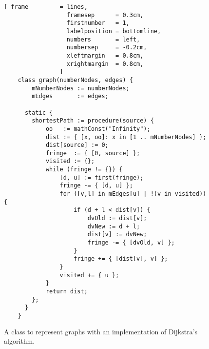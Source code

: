 \begin{figure}[!ht]
\centering
\begin{Verbatim}[ frame         = lines, 
                  framesep      = 0.3cm, 
                  firstnumber   = 1,
                  labelposition = bottomline,
                  numbers       = left,
                  numbersep     = -0.2cm,
                  xleftmargin   = 0.8cm,
                  xrightmargin  = 0.8cm,
                ]
    class graph(numberNodes, edges) {
        mNumberNodes := numberNodes;
        mEdges       := edges;
    
      static {
        shortestPath := procedure(source) {
            oo   := mathConst("Infinity");
            dist := { [x, oo]: x in [1 .. mNumberNodes] };
            dist[source] := 0;
            fringe  := { [0, source] };
            visited := {};
            while (fringe != {}) {
                [d, u] := first(fringe);
                fringe -= { [d, u] };
                for ([v,l] in mEdges[u] | !(v in visited)) {
                    if (d + l < dist[v]) {
                        dvOld := dist[v];
                        dvNew := d + l;
                        dist[v] := dvNew;
                        fringe -= { [dvOld, v] };
                    }
                    fringe += { [dist[v], v] };
                }
                visited += { u };
            }
            return dist;
        };
      }
    }
\end{Verbatim}
\vspace*{-0.3cm}
\caption{A class to represent graphs with an implementation of Dijkstra's algorithm.}
\label{fig:dijkstra.stlx}
\end{figure}

\vspace*{0.3cm}

